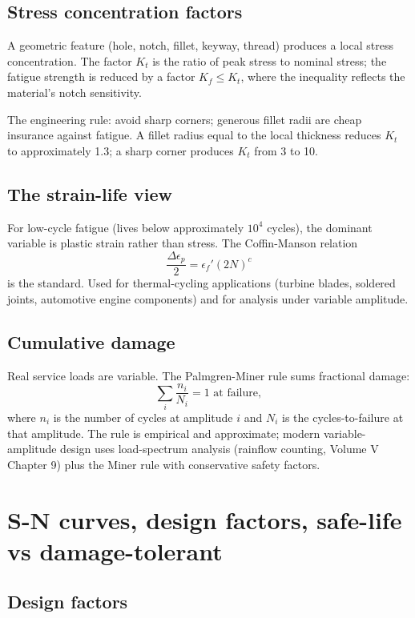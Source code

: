 \subsection{Stress concentration factors}

A geometric feature (hole, notch, fillet, keyway, thread) produces a local stress concentration. The factor $K_t$ is the ratio of peak stress to nominal stress; the fatigue strength is reduced by a factor $K_f \leq K_t$, where the inequality reflects the material's notch sensitivity.

The engineering rule: avoid sharp corners; generous fillet radii are cheap insurance against fatigue. A fillet radius equal to the local thickness reduces $K_t$ to approximately 1.3; a sharp corner produces $K_t$ from 3 to 10.

\subsection{The strain-life view}

For low-cycle fatigue (lives below approximately $10^4$ cycles), the dominant variable is plastic strain rather than stress. The Coffin-Manson relation
\[
\frac{\Delta \epsilon_p}{2} = \epsilon_f' (2 N)^c
\]
is the standard. Used for thermal-cycling applications (turbine blades, soldered joints, automotive engine components) and for analysis under variable amplitude.

\subsection{Cumulative damage}

Real service loads are variable. The Palmgren-Miner rule sums fractional damage:
\[
\sum_i \frac{n_i}{N_i} = 1 \text{ at failure},
\]
where $n_i$ is the number of cycles at amplitude $i$ and $N_i$ is the cycles-to-failure at that amplitude. The rule is empirical and approximate; modern variable-amplitude design uses load-spectrum analysis (rainflow counting, Volume V Chapter 9) plus the Miner rule with conservative safety factors.

\section{S-N curves, design factors, safe-life vs damage-tolerant}

\subsection{Design factors}

